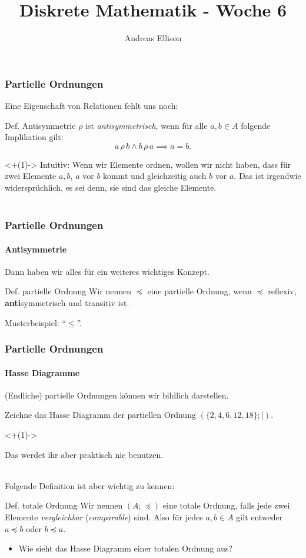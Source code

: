 \documentclass[t,dvipsnames]{beamer}
\title{Diskrete Mathematik - Woche 6}
\author{Andreas Ellison}
\newcommand{\isrel}[3]{#1 \, #3 \, #2}
\begin{document}
\begin{frame}
	\frametitle{Partielle Ordnungen}
	Eine Eigenschaft von Relationen fehlt uns noch:
	\begin{block}{Def. Antisymmetrie}
		$\rho$ ist \textit{antisymmetrisch}, wenn für alle $a, b \in A$ folgende Implikation gilt:
		$$
			\isrel{a}{b}{\rho} \land \isrel{b}{a}{\rho} \implies  a = b.
		$$
	\end{block}
	\only<+(1)->{
		Intuitiv: Wenn wir Elemente ordnen, wollen wir nicht haben, dass für zwei Elemente $a, b$, $a$ vor $b$ kommt und gleichzeitig auch $b$ vor $a$. Das ist irgendwie widersprüchlich, es sei denn, sie sind das gleiche Elemente. \\~
	}
\end{frame}

\begin{frame}
	\frametitle{Partielle Ordnungen}
	\framesubtitle{Antisymmetrie}

	Dann haben wir alles für ein weiteres wichtiges Konzept.
	\begin{block}{Def. partielle Ordnung}
		Wir nennen $\preceq$ eine partielle Ordnung, wenn $\preceq$ reflexiv, \textbf{anti}symmetrisch und transitiv ist.
	\end{block}
	Musterbeispiel: ``$\le$''.
\end{frame}


\begin{frame}
	\frametitle{Partielle Ordnungen}
	\framesubtitle{Hasse Diagramme}
	(Endliche) partielle Ordnungen können wir bildlich darstellen.
	\begin{Beispiel}
		Zeichne das Hasse Diagramm der partiellen Ordnung $(\{2, 4, 6, 12, 18\}; |)$.
	\end{Beispiel}

	\only<+(1)->{
		Das werdet ihr aber praktisch nie benutzen. \\~

		Folgende Definition ist aber wichtig zu kennen:
		\begin{block}{Def. totale Ordnung}
			Wir nennen $(A; \preceq)$ eine totale Ordnung, falls jede zwei Elemente \textit{vergleichbar} (\textit{comparable}) sind.
			Also für jedes $a, b \in A$ gilt entweder $a \preceq b$ oder $b \preceq a$.
		\end{block}
		\begin{itemize}[<+(1)->]
			\item Wie sieht das Hasse Diagramm einer totalen Ordnung aus?
		\end{itemize}
	}
\end{frame}
\end{document}
